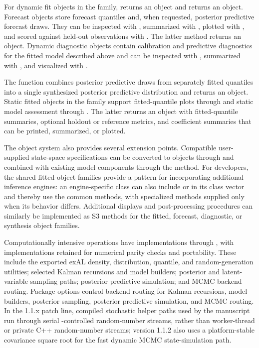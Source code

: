 \documentclass{jss}
\begin{document}
For dynamic fit objects in the  family,  returns an  object and  returns an  object. Forecast objects store forecast quantiles and, when requested, posterior predictive forecast draws. They can be inspected with , summarized with , plotted with , and scored against held-out observations with . The latter method returns an  object. Dynamic diagnostic objects contain calibration and predictive diagnostics for the fitted model described above and can be inspected with , summarized with , and visualized with .

The function  combines posterior predictive draws from separately fitted quantiles into a single synthesized posterior predictive distribution and returns an  object. Static fitted objects in the  family support fitted-quantile plots through  and static model assessment through . The latter returns an   object with fitted-quantile summaries, optional holdout or reference metrics, and coefficient summaries that can be printed, summarized, or plotted.

The object system also provides several extension points. Compatible user-supplied state-space specifications can be converted to  objects through  and combined with existing model components through the \code{+} method. For developers, the shared fitted-object families provide a pattern for incorporating additional inference engines: an engine-specific class can also include  or  in its class vector and thereby use the common methods, with specialized methods supplied only when its behavior differs. Additional displays and post-processing procedures can similarly be implemented as S3 methods for the fitted, forecast, diagnostic, or synthesis object families.

Computationally intensive operations have  implementations through ,  with  implementations retained for numerical parity checks and portability. These include the exported exAL density, distribution, quantile, and random-generation utilities; selected Kalman recursions and model builders; posterior and latent-variable sampling paths; posterior predictive simulation; and MCMC backend routing. Package options control backend routing for Kalman recursions, model builders, posterior sampling, posterior predictive simulation, and MCMC routing. In the 1.1.x patch line, compiled stochastic helper paths used by the manuscript run through serial -controlled random-number streams, rather than worker-thread or private C++ random-number streams; version 1.1.2 also uses a platform-stable covariance square root for the fast dynamic MCMC state-simulation path.
\end{document}
